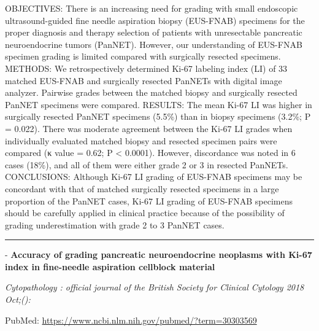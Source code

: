\documentclass[]{article}
\begin{document}
OBJECTIVES: There is an increasing need for grading with small
endoscopic ultrasound-guided fine needle aspiration biopsy (EUS-FNAB)
specimens for the proper diagnosis and therapy selection of patients
with unresectable pancreatic neuroendocrine tumors (PanNET). However,
our understanding of EUS-FNAB specimen grading is limited compared with
surgically resected specimens. METHODS: We retrospectively determined
Ki-67 labeling index (LI) of 33 matched EUS-FNAB and surgically resected
PanNETs with digital image analyzer. Pairwise grades between the matched
biopsy and surgically resected PanNET specimens were compared. RESULTS:
The mean Ki-67 LI was higher in surgically resected PanNET specimens
(5.5\%) than in biopsy specimens (3.2\%; P = 0.022). There was moderate
agreement between the Ki-67 LI grades when individually evaluated
matched biopsy and resected specimen pairs were compared (κ value =
0.62; P \textless{} 0.0001). However, discordance was noted in 6 cases
(18\%), and all of them were either grade 2 or 3 in resected PanNETs.
CONCLUSIONS: Although Ki-67 LI grading of EUS-FNAB specimens may be
concordant with that of matched surgically resected specimens in a large
proportion of the PanNET cases, Ki-67 LI grading of EUS-FNAB specimens
should be carefully applied in clinical practice because of the
possibility of grading underestimation with grade 2 to 3 PanNET cases.

{}

{}

\begin{center}\rule{0.5\linewidth}{\linethickness}\end{center}

 - \textbf{Accuracy of grading pancreatic neuroendocrine neoplasms with
Ki-67 index in fine-needle aspiration cellblock material}

\emph{Cytopathology : official journal of the British Society for
Clinical Cytology 2018 Oct;():}

PubMed: \url{https://www.ncbi.nlm.nih.gov/pubmed/?term=30303569}
\end{document}
